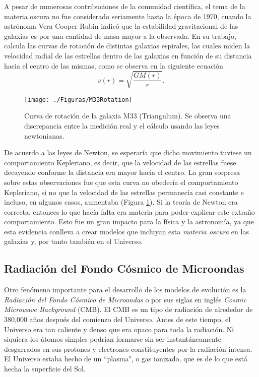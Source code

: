 \documentclass[a4paper,openright,12pt]{book}
\begin{document}
A pesar de numerosas contribuciones de la comunidad científica, el tema de la materia oscura no fue considerado seriamente hasta la época de 1970, cuando la astrónoma Vera Cooper Rubin \cite{1.1.2} indicó que la estabilidad gravitacional de las galaxias es por una cantidad de masa mayor a la observada. En su trabajo, calcula las curvas de rotación de distintas galaxias espirales, las cuales miden la velocidad radial de las estrellas dentro de las galaxias en función de su distancia hacia el centro de las mismas, como se observa en la siguiente ecuación
\begin{equation}
v (r)
=
\sqrt{\frac{G M (r)}{r}}.\label{eqn 1.42}
\end{equation} 
\begin{figure}
\centering
    \texttt{[image: ./Figuras/M33Rotation]}
  \caption{\footnotesize{Curva de rotación de la galaxia M33 (Triangulum). Se observa una discrepancia entre la medición real y el cálculo usando las leyes newtonianas.}}
  \label{fig 1.2}
\end{figure}
De acuerdo a las leyes de Newton, se esperaría que dicho movimiento tuviese un comportamiento Kepleriano, es decir, que la velocidad de las estrellas fuese decayendo conforme la distancia era mayor hacia el centro. La gran sorpresa sobre estas observaciones fue que esta curva no obedecía el comportamiento Kepleriano, si no que la velocidad de las estrellas permanecía casi constante e incluso, en algunos casos, aumentaba (Figura \ref{fig 1.2}). Si la teoría de Newton era correcta, entonces lo que hacía falta era materia para poder explicar este extraño comportamiento. Esto fue un gran impacto para la física y la astronomía, ya que esta evidencia conlleva a crear modelos que incluyan esta \textit{materia oscura} en las galaxias y, por tanto también en el Universo.

\subsection*{Radiación del Fondo Cósmico de Microondas}
Otro fenómeno importante para el desarrollo de los modelos de evolución es la \textit{Radiación del Fondo Cósmico de Microondas} o por sus siglas en inglés \textit{Cosmic Microwave Background} (CMB). El CMB es un tipo de radiación de alrededor de 380,000 años después del comienzo del Universo. Antes de este tiempo, el Universo era tan caliente y denso que era opaco para toda la radiación. Ni siquiera los átomos simples podrían formarse sin ser instantáneamente desgarrados en sus protones y electrones constituyentes por la radiación intensa. El Universo estaba hecho de un ``plasma", o gas ionizado, que es de lo que está hecha la superficie del Sol.
\end{document}
